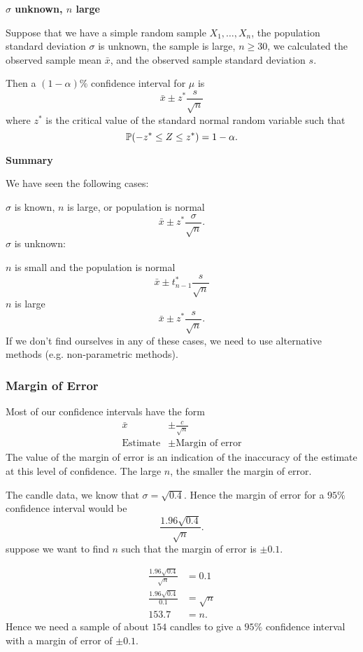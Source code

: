 \documentclass[10pt, a4paper]{article}
\begin{document}
\textbf{$\sigma$ unknown,
$n$ large}

Suppose that we have a simple random sample $X_1, \dotsc, X_n$,
the population standard deviation $\sigma$ is unknown,
the sample is large,
$n \geq 30$,
we calculated the observed sample mean $\bar{x}$,
and the observed sample standard deviation $s$.

Then a $(1 - \alpha)\%$ confidence interval for $\mu$ is
\[
\bar{x} \pm z ^ {*}\frac{s}{\sqrt{n}}
\]
where $z ^ {*}$ is the critical value of the standard normal random variable such that
\[
\P(-z ^ {*} \leq Z \leq z ^ {*}) = 1 - \alpha.
\]

\textbf{Summary}

We have seen the following cases:

$\sigma$ is known,
$n$ is large,
or population is normal
\[
\bar{x} \pm z ^ {*}\frac{\sigma}{\sqrt{n}}.
\]
$\sigma$ is unknown:

$n$ is small and the population is normal
\[
\bar{x} \pm t_{n - 1}^{*}\frac{s}{\sqrt{n}}
\]
$n$ is large
\[
\bar{x} \pm z ^ {*}\frac{s}{\sqrt{n}}.
\]
If we don't find ourselves in any of these cases,
we need to use alternative methods
(e.g. non-parametric methods).


\subsubsection{Margin of Error}
Most of our confidence intervals have the form
\begin{align*}
    \bar{x} &\pm \frac{c}{\sqrt{n}} \\
    \text{Estimate}&\pm\text{Margin of error}
\end{align*}
The value of the margin of error is an indication of the inaccuracy of the estimate at this level of confidence.
The large $n$,
the smaller the margin of error.

\begin{example}
    The candle data,
    we know that $\sigma = \sqrt{0.4}$.
    Hence the margin of error for a $95\%$ confidence interval would be
    \[
    \frac{1.96\sqrt{0.4}}{\sqrt{n}}.
    \]
    suppose we want to find $n$ such that the margin of error is $\pm 0.1$.
    \begin{solution}
        \begin{align*}
            \frac{1.96\sqrt{0.4}}{\sqrt{n}} &= 0.1 \\
            \frac{1.96\sqrt{0.4}}{0.1} &= \sqrt{n} \\
            153.7 &= n.
        \end{align*}
        Hence we need a sample of about $154$ candles to give a $95\%$ confidence interval with a margin of error of $\pm 0.1$.
    \end{solution}
\end{example}
\end{document}
